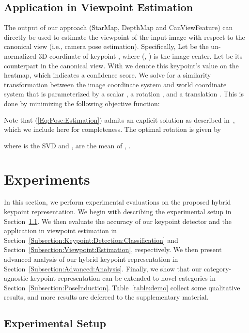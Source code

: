 \documentclass[runningheads]{llncs}
\begin{document}
\subsection{Application in Viewpoint Estimation}
\label{Section:Pose:Estimation}

The output of our approach (StarMap, DepthMap and CanViewFeature) can directly be used to estimate the viewpoint of the input image with respect to the canonical view (i.e., camera pose estimation). Specifically, Let  be the un-normalized 3D coordinate of keypoint , where (, ) is the image center. Let  be its counterpart in the canonical view. With  we denote this keypoint's value on the heatmap, which indicates a confidence score. We solve for a similarity transformation between the image coordinate system and world coordinate system that is parameterized by a scalar , a rotation , and a translation . This is done by minimizing the following objective function:

Note that (\ref{Eq:Pose:Estimation}) admits an explicit solution as described in~\cite{horn1987closed}, which we include here for completeness. The optimal rotation is given by

where  is the SVD and ,  are the mean of , . 
 \section{Experiments}

In this section, we perform experimental evaluations on the proposed hybrid keypoint representation. We begin with describing the experimental setup in Section~\ref{Subsection:Experimental:Setup}. We then evaluate the accuracy of our keypoint detector and the application in viewpoint estimation in Section~\ref{Subsection:Keypoint:Detection:Classification} and Section~\ref{Subsection:Viewpoint:Estimation}, respectively. We then present advanced analysis of our hybrid keypoint representation in Section~\ref{Subsection:Advanced:Analysis}. 
Finally, we show that our category-agnostic keypoint representation can be extended to novel categories in Section~\ref{Subsection:PoseInduction}.
Table~\ref{table:demo} collect some qualitative results, and more results are deferred to the supplementary material.

\subsection{Experimental Setup}
\label{Subsection:Experimental:Setup}
\end{document}
